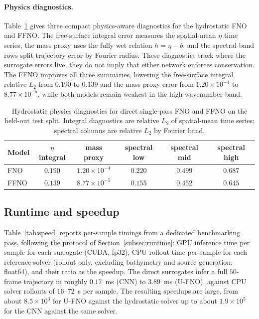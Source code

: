 \paragraph{Physics diagnostics.}
Table~\ref{tab:physics-diag} gives three compact physics-aware diagnostics for the hydrostatic FNO and FFNO. The free-surface integral error measures the spatial-mean $\eta$ time series, the mass proxy uses the fully wet relation $h = \eta - b$, and the spectral-band rows split trajectory error by Fourier radius. These diagnostics track where the surrogate errors live; they do not imply that either network enforces conservation. The FFNO improves all three summaries, lowering the free-surface integral relative $L_2$ from $0.190$ to $0.139$ and the mass-proxy error from $1.20 \times 10 ^ {-4}$ to $8.77 \times 10 ^ {-5}$, while both models remain weakest in the high-wavenumber band.

\begin{table}[!htbp]
\centering
\caption{Hydrostatic physics diagnostics for direct single-pass FNO and FFNO on the held-out test split. Integral diagnostics are relative $L_2$ of spatial-mean time series; spectral columns are relative $L_2$ by Fourier band.}
\label{tab:physics-diag}
\begin{tabular}{lccccc}
    \toprule
    Model & $\eta$ integral & mass proxy & spectral low & spectral mid & spectral high \\
    \midrule
    FNO  & $0.190$ & $1.20 \times 10 ^ {-4}$ & $0.220$ & $0.499$ & $0.687$ \\
    FFNO & $0.139$ & $8.77 \times 10 ^ {-5}$ & $0.155$ & $0.452$ & $0.645$ \\
    \bottomrule
\end{tabular}
\end{table}

\subsection{Runtime and speedup}
\label{subsec:res-speed}

Table~\ref{tab:speed} reports per-sample timings from a dedicated benchmarking pass, following the protocol of Section~\ref{subsec:runtime}: GPU inference time per sample for each surrogate (CUDA, fp32), CPU rollout time per sample for each reference solver (rollout only, excluding bathymetry and source generation; float64), and their ratio as the speedup. The direct surrogates infer a full $50$-frame trajectory in roughly $0.17$~ms (CNN) to $3.89$~ms (U-FNO), against CPU solver rollouts of $16$--$72$~s per sample. The resulting speedups are large, from about $8.5 \times 10 ^ {3}$ for U-FNO against the hydrostatic solver up to about $1.9 \times 10 ^ {5}$ for the CNN against the same solver.

